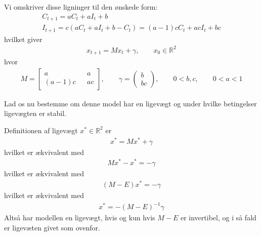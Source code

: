 \documentclass[12pt]{article}
\begin{document}
Vi omskriver disse ligninger til den ønskede form:
\begin{align}
C_{t+1} = aC_t + aI_t + b \\
I_{t+1} = c(aC_t + aI_t + b - C_t) = (a-1)cC_t + acI_t + bc
\end{align}
hvilket giver
\begin{align}
x_{t+1} = Mx_t + \gamma, \qquad x_0\in \mathbb{R}^2
\end{align}
hvor
\begin{align}
M = \begin{bmatrix}
a && a \\
(a-1)c && ac
\end{bmatrix}, \qquad \gamma = \begin{pmatrix}
b \\ bc
\end{pmatrix}, \qquad 0<b,c,\qquad 0<a<1
\end{align}

Lad os nu bestemme om denne model har en ligevægt og under hvilke betingelser ligevægten er stabil.

Definitionen af ligevægt $x^* \in \mathbb{R}^2$ er
\begin{align}
x^* = Mx^* + \gamma
\end{align}
hvilket er ækvivalent med
\begin{align}
Mx^* - x^* = - \gamma
\end{align}
hvilket er ækvivalent med
\begin{align}
(M - E)x^* = - \gamma
\end{align}
hvilket er ækvivalent med
\begin{align}
x^* = - (M - E)^{-1} \gamma
\end{align}
Altså har modellen en ligevægt, hvis og kun hvis $M-E$ er invertibel, og i så fald er ligevæten givet som ovenfor.
\end{document}
